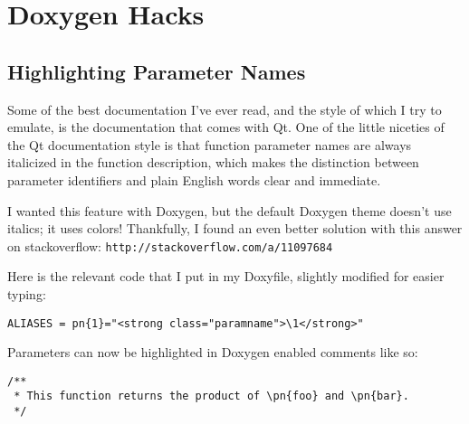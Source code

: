 \section*{Doxygen Hacks}
\subsection*{Highlighting Parameter Names}
Some of the best documentation I've ever read, and the style of which I try to emulate, is the documentation that comes with Qt. One of the little niceties of the Qt documentation style is that function parameter names are always italicized in the function description, which makes the distinction between parameter identifiers and plain English words clear and immediate.

I wanted this feature with Doxygen, but the default Doxygen theme doesn't use italics; it uses colors! Thankfully, I found an even better solution with this answer on stackoverflow: {\tt http://stackoverflow.com/a/11097684}

Here is the relevant code that I put in my Doxyfile, slightly modified for easier typing:
\begin{verbatim}
ALIASES = pn{1}="<strong class="paramname">\1</strong>"
\end{verbatim}

Parameters can now be highlighted in Doxygen enabled comments like so:
\begin{verbatim}
/**
 * This function returns the product of \pn{foo} and \pn{bar}.
 */
\end{verbatim}
